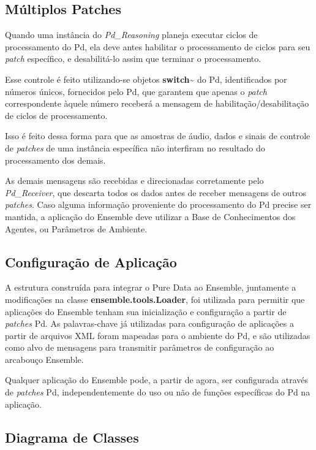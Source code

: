 \documentclass[a4paper, 11pt, twoside]{article}
\begin{document}
\begin{multicols}{2}
\subsection{Múltiplos Patches}

Quando uma instância do \textit{Pd\_Reasoning} planeja executar ciclos de 
processamento do Pd, ela deve antes habilitar o processamento de ciclos 
para seu \textit{patch} específico, e desabilitá-lo assim que terminar o 
processamento.

Esse controle é feito utilizando-se objetos \textbf{switch\~} do Pd,
identificados por números únicos, fornecidos pelo Pd, que garantem
que apenas o \textit{patch} correspondente àquele número receberá a
mensagem de habilitação/desabilitação de ciclos de processamento.

Isso é feito dessa forma para que as amostras de áudio, dados e sinais de 
controle de \textit{patches} de uma instância específica não interfiram no
resultado do processamento dos demais.

As demais mensagens são recebidas e direcionadas corretamente pelo 
\textit{Pd\_Receiver}, que descarta todos os dados antes de receber 
mensagens de outros \textit{patches}. Caso alguma informação proveniente
do processamento do Pd precise ser mantida, a aplicação do Ensemble deve
utilizar a Base de Conhecimentos dos Agentes, ou Parâmetros de Ambiente.

\subsection{Configuração de Aplicação}

A estrutura construída para integrar o Pure Data ao Ensemble,
juntamente a modificações na classe \textbf{ensemble.tools.Loader}, 
foi utilizada para permitir que aplicações do Ensemble tenham sua 
inicialização e configuração a partir de \textit{patches} Pd. 
As palavras-chave já utilizadas para configuração de
aplicações a partir de arquivos XML foram mapeadas para o ambiente do Pd,
e são utilizadas como alvo de mensagens para transmitir parâmetros 
de configuração ao arcabouço Ensemble.

Qualquer aplicação do Ensemble pode, a partir de agora,  ser configurada através 
de \textit{patches} Pd, independentemente do uso ou não de funções específicas do Pd na aplicação.

\subsection{Diagrama de Classes}\label{sec:diagrama}

\end{multicols}
\end{document}
